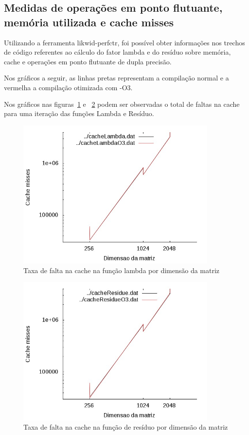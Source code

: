 \documentclass[12pt]{article}
\begin{document}
\subsection{Medidas de operações em ponto flutuante, memória utilizada e cache
misses}\label{sec:FlopsMemCache}

Utilizando a ferramenta likwid-perfctr, foi possível obter informações nos
trechos de código referentes ao cálculo do fator lambda e do resíduo sobre
memória, cache e operações em ponto flutuante de dupla precisão.

Nos gráficos a seguir, as linhas pretas representam a compilação normal e a
vermelha a compilação otimizada com -O3.

Nos gráficos nas figuras~\ref{fig:cacheLambda} e ~\ref{fig:cacheResidue} podem
ser observadas o total de faltas na cache para uma iteração das funções Lambda
e Resíduo.

\begin{figure} \begin{center}
\includegraphics[width=100mm]{img/cacheMissLambda.jpg} \end{center}
\caption{Taxa de falta na cache na função lambda por dimensão da matriz}\label{fig:cacheLambda}
\end{figure}

\begin{figure} \begin{center}
\includegraphics[width=100mm]{img/cacheMissResidue.jpg} \end{center}
\caption{Taxa de falta na cache na função de resíduo por dimensão da matriz}\label{fig:cacheResidue}
\end{figure}
\end{document}
